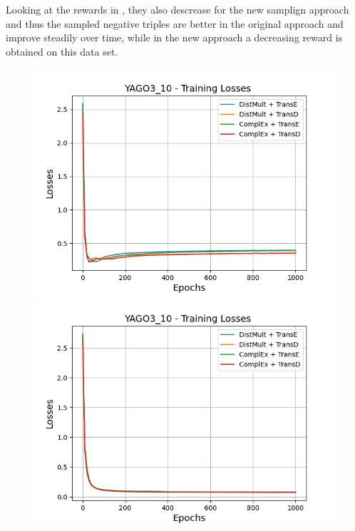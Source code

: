 Looking at the rewards in , they also descrease for the new samplign approach and thus the sampled negative triples are better in the original approach and improve steadily over time, while in the new approach a decreasing reward is obtained on this data set.
\begin{figure}[H]
    \centering
    \begin{minipage}{.5\textwidth}
      \centering
      \includegraphics[width=0.9\linewidth]{figures/results/gan_train/not_pretrained/random/yago3_10/1k_epochs/random_yago3_10_losses.png}
    \end{minipage}%
    \begin{minipage}{.5\textwidth}
      \centering
      \includegraphics[width=0.9\linewidth]{figures/results/gan_train/not_pretrained/uncertainty/max_distribution/entropy/yago3_10/1k_epochs/uncertainty_yago3_10_losses.png}

\end{minipage}
\end{figure}
